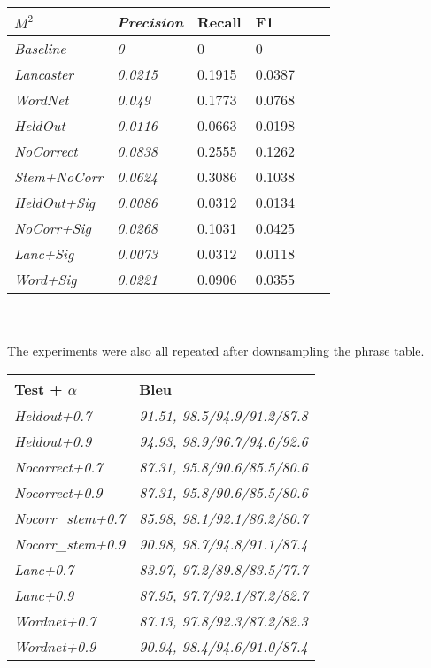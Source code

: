 \documentclass[11pt,letterpaper]{article}
\begin{document}
\begin{tabular}{ |l|l|l|l|l|l| }
\hline
\textit{$M^2$} & \textit{Precision} & Recall & F1 \\ \hline
\textit{Baseline} & \textit{0} & 0 & 0 \\ \hline
\textit{Lancaster} & \textit{0.0215} & 0.1915 & 0.0387 \\ \hline
\textit{WordNet} & \textit{0.049} & 0.1773 & 0.0768 \\ \hline
\textit{HeldOut} & \textit{0.0116} & 0.0663 & 0.0198 \\ \hline
\textit{NoCorrect} & \textit{0.0838} & 0.2555 & 0.1262 \\ \hline
\textit{Stem+NoCorr} & \textit{0.0624} & 0.3086 & 0.1038 \\ \hline
\textit{HeldOut+Sig} & \textit{0.0086} & 0.0312 & 0.0134 \\ \hline
\textit{NoCorr+Sig} & \textit{0.0268} & 0.1031 & 0.0425 \\ \hline
\textit{Lanc+Sig} & \textit{0.0073} & 0.0312 & 0.0118 \\ \hline
\textit{Word+Sig} & \textit{0.0221} & 0.0906 & 0.0355 \\ \hline
\end{tabular}
\\\\

The experiments were also all repeated after downsampling the phrase table.\\

\begin{tabular}{ |l|l|}
\hline
\textbf{Test + $\alpha$} & \textbf{Bleu} \\ \hline
\textit{Heldout+0.7} & \textit{91.51, 98.5/94.9/91.2/87.8} \\ \hline
\textit{Heldout+0.9} & \textit{94.93, 98.9/96.7/94.6/92.6} \\ \hline
\textit{Nocorrect+0.7} & \textit{87.31, 95.8/90.6/85.5/80.6 } \\ \hline
\textit{Nocorrect+0.9} & \textit{87.31, 95.8/90.6/85.5/80.6 } \\ \hline
\textit{Nocorr\_stem+0.7} & \textit{85.98, 98.1/92.1/86.2/80.7 } \\ \hline
\textit{Nocorr\_stem+0.9} & \textit{90.98, 98.7/94.8/91.1/87.4 } \\ \hline
\textit{Lanc+0.7} & \textit{83.97, 97.2/89.8/83.5/77.7 } \\ \hline
\textit{Lanc+0.9} & \textit{87.95, 97.7/92.1/87.2/82.7 } \\ \hline
\textit{Wordnet+0.7} & \textit{87.13, 97.8/92.3/87.2/82.3 } \\ \hline
\textit{Wordnet+0.9} & \textit{90.94, 98.4/94.6/91.0/87.4 } \\ \hline
\end{tabular}
\end{document}
